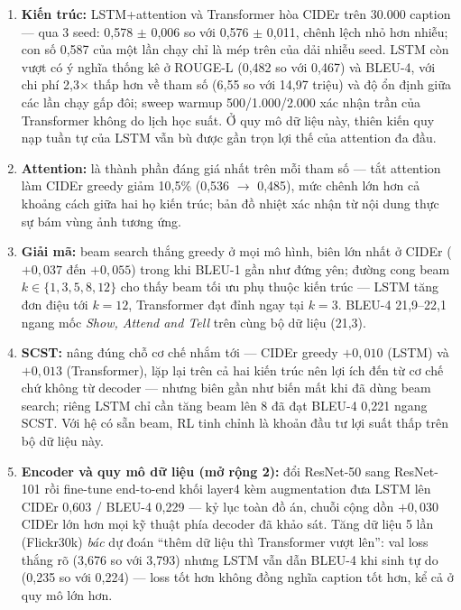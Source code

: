 \begin{enumerate}
	\item \textbf{Kiến trúc:} LSTM+attention và Transformer hòa CIDEr trên
	      30.000 caption --- qua 3 seed: 0,578 $\pm$ 0,006 so với 0,576 $\pm$
	      0,011, chênh lệch nhỏ hơn nhiễu; con số 0,587 của một lần chạy chỉ là
	      mép trên của dải nhiễu seed. LSTM còn vượt có ý nghĩa thống kê ở
	      ROUGE-L (0,482 so với 0,467) và BLEU-4, với chi phí 2,3$\times$ thấp
	      hơn về tham số (6,55 so với 14,97 triệu) và độ ổn định giữa các lần
	      chạy gấp đôi; sweep warmup 500/1.000/2.000 xác nhận trần của
	      Transformer không do lịch học suất. Ở quy mô dữ liệu này, thiên kiến
	      quy nạp tuần tự của LSTM vẫn bù được gần trọn lợi thế của attention
	      đa đầu.
	\item \textbf{Attention:} là thành phần đáng giá nhất trên mỗi tham số ---
	      tắt attention làm CIDEr greedy giảm 10,5\% (0,536 $\to$ 0,485), mức
	      chênh lớn hơn cả khoảng cách giữa hai họ kiến trúc; bản đồ nhiệt xác
	      nhận từ nội dung thực sự bám vùng ảnh tương ứng.
	\item \textbf{Giải mã:} beam search thắng greedy ở mọi mô hình, biên lớn
	      nhất ở CIDEr ($+0{,}037$ đến $+0{,}055$) trong khi BLEU-1 gần như
	      đứng yên; đường cong beam $k \in \{1,3,5,8,12\}$ cho thấy beam tối ưu
	      phụ thuộc kiến trúc --- LSTM tăng đơn điệu tới $k{=}12$, Transformer
	      đạt đỉnh ngay tại $k{=}3$. BLEU-4 21,9--22,1 ngang mốc \emph{Show,
	      Attend and Tell} trên cùng bộ dữ liệu (21,3).
	\item \textbf{SCST:} nâng đúng chỗ cơ chế nhắm tới --- CIDEr greedy
	      $+0{,}010$ (LSTM) và $+0{,}013$ (Transformer), lặp lại trên cả hai
	      kiến trúc nên lợi ích đến từ cơ chế chứ không từ decoder --- nhưng
	      biên gần như biến mất khi đã dùng beam search; riêng LSTM chỉ cần
	      tăng beam lên 8 đã đạt BLEU-4 0,221 ngang SCST. Với hệ có sẵn beam,
	      RL tinh chỉnh là khoản đầu tư lợi suất thấp trên bộ dữ liệu này.
	\item \textbf{Encoder và quy mô dữ liệu (mở rộng 2):} đổi ResNet-50 sang
	      ResNet-101 rồi fine-tune end-to-end khối layer4 kèm augmentation đưa
	      LSTM lên CIDEr 0,603 / BLEU-4 0,229 --- kỷ lục toàn đồ án, chuỗi
	      cộng dồn $+0{,}030$ CIDEr lớn hơn mọi kỹ thuật phía decoder đã khảo
	      sát. Tăng dữ liệu 5 lần (Flickr30k) \emph{bác} dự đoán ``thêm dữ
	      liệu thì Transformer vượt lên'': val loss thắng rõ (3,676 so với
	      3,793) nhưng LSTM vẫn dẫn BLEU-4 khi sinh tự do (0,235 so với
	      0,224) --- loss tốt hơn không đồng nghĩa caption tốt hơn, kể cả ở
	      quy mô lớn hơn.
\end{enumerate}


